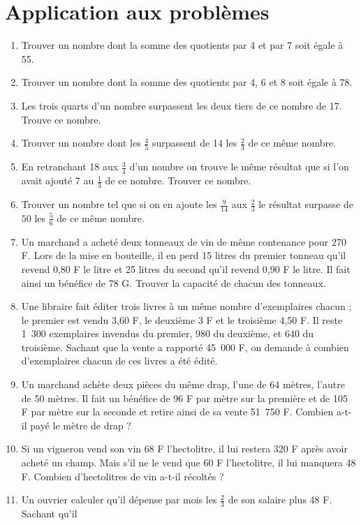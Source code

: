 
 \chapter{Application aux problèmes}
 \begin{enumerate}
 \item Trouver un nombre dont la somme des quotients par 
 4 et par 7 soit égale à 55. 
 \item Trouver un nombre dont la somme des quotients par 4, 6 et 8 soit égale à 78.
 \item Les trois quarts d'un nombre surpassent les deux tiers de ce nombre de 17. Trouve ce nombre.
 \item Trouver un nombre dont les $\frac45$ surpassent de 14 les $\frac23$ de ce même nombre. 
 \item En retranchant 18 aux $\frac34$ d'un nombre on trouve le même résultat que si l'on avait ajouté 7 au 
 $\frac13$ de ce nombre. Trouver ce nombre.
 \item Trouver un nombre tel que si on en ajoute les $\frac9{14}$ aux $\frac23$ le résultat surpasse de $50$ les $\frac56$ de ce même nombre.
\item Un marchand a acheté deux tonneaux de vin de même 
 contenance pour 270 F. Lors de la mise en bouteille, il 
 en perd 15 litres du premier tonneau qu'il revend 0,80 F 
 le litre et 25 litres du second qu'il revend 0,90 F le 
 litre. Il fait ainsi un bénéfice de 78 G. Trouver la 
 capacité de chacun des tonneaux. 
\item Une libraire fait éditer trois livres à un même 
 nombre d'exemplaires chacun ; le premier est vendu 3,60 
 F, le deuxième 3 F et le troisième 4,50 F. Il reste 1~300 
 exemplaires invendus du premier, 980 du deuxième, et 640 
 du troisième. Sachant que la vente a rapporté 45~000 F, 
 on demande à combien d'exemplaires chacun de ces livres a 
 été édité.
 \item Un marchand achète deux pièces du même drap, l'une 
 de 64 mètres, l'autre de 50 mètres. Il fait un bénéfice 
 de 96 F par mètre sur la première et de 105 F par mètre 
 sur la seconde et retire ainsi de sa vente 51~750 F. 
 Combien a-t-il payé le mètre de drap ? 
 \item Si un vigneron vend son vin 68 F l'hectolitre, il 
 lui restera 320 F après avoir acheté un champ. Mais s'il 
 ne le vend que 60 F l'hectolitre, il lui manquera 48 F. 
 Combien d'hectolitres de vin a-t-il récoltés ? 
 \item Un ouvrier calculer qu'il dépense par mois les 
 $\frac23$ de son salaire plus 48 F. Sachant qu'il 

\end{enumerate}
